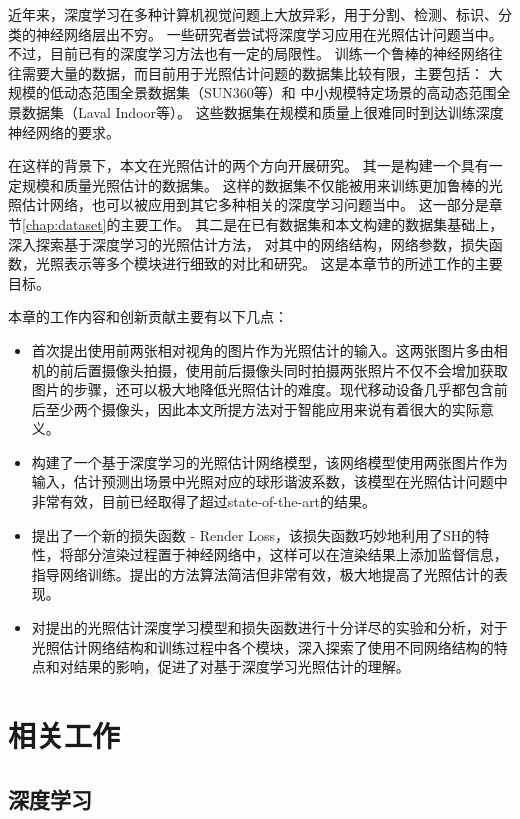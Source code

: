 近年来，深度学习在多种计算机视觉问题上大放异彩，用于分割、检测、标识、分类的神经网络层出不穷。
一些研究者尝试将深度学习应用在光照估计问题当中。
不过，目前已有的深度学习方法也有一定的局限性。
训练一个鲁棒的神经网络往往需要大量的数据，而目前用于光照估计问题的数据集比较有限，主要包括：
大规模的低动态范围全景数据集（SUN360等）和
中小规模特定场景的高动态范围全景数据集（Laval Indoor等）。
这些数据集在规模和质量上很难同时到达训练深度神经网络的要求。

在这样的背景下，本文在光照估计的两个方向开展研究。
其一是构建一个具有一定规模和质量光照估计的数据集。
这样的数据集不仅能被用来训练更加鲁棒的光照估计网络，也可以被应用到其它多种相关的深度学习问题当中。
这一部分是章节\ref{chap:dataset}的主要工作。
其二是在已有数据集和本文构建的数据集基础上，深入探索基于深度学习的光照估计方法，
对其中的网络结构，网络参数，损失函数，光照表示等多个模块进行细致的对比和研究。
这是本章节的所述工作的主要目标。

本章的工作内容和创新贡献主要有以下几点：
\begin{itemize}
    \item 首次提出使用前两张相对视角的图片作为光照估计的输入。这两张图片多由相机的前后置摄像头拍摄，使用前后摄像头同时拍摄两张照片不仅不会增加获取图片的步骤，还可以极大地降低光照估计的难度。现代移动设备几乎都包含前后至少两个摄像头，因此本文所提方法对于智能应用来说有着很大的实际意义。
    \item 构建了一个基于深度学习的光照估计网络模型，该网络模型使用两张图片作为输入，估计预测出场景中光照对应的球形谐波系数，该模型在光照估计问题中非常有效，目前已经取得了超过state-of-the-art的结果。
    \item 提出了一个新的损失函数 - Render Loss，该损失函数巧妙地利用了SH的特性，将部分渲染过程置于神经网络中，这样可以在渲染结果上添加监督信息，指导网络训练。提出的方法算法简洁但非常有效，极大地提高了光照估计的表现。
    \item 对提出的光照估计深度学习模型和损失函数进行十分详尽的实验和分析，对于光照估计网络结构和训练过程中各个模块，深入探索了使用不同网络结构的特点和对结果的影响，促进了对基于深度学习光照估计的理解。
\end{itemize}

\section{相关工作}
\subsection{深度学习}
